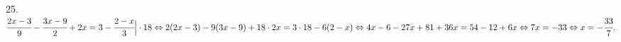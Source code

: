 25. $\cfrac{2x-3}{9}-\cfrac{3x-9}{2}+2x=3-\cfrac{2-x}{3}\Big|\cdot18\Leftrightarrow
2(2x-3)-9(3x-9)+18\cdot2x=3\cdot18-6(2-x)\Leftrightarrow
4x-6-27x+81+36x=54-12+6x\Leftrightarrow
7x=-33\Leftrightarrow x=-\cfrac{33}{7}.$\\
